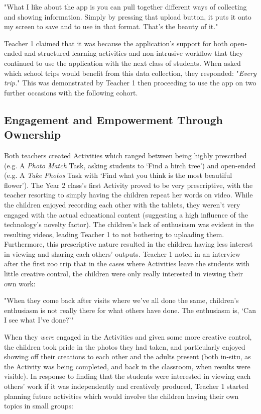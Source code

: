 \begin{displayquote}
"What I like about the app is you can pull together different ways of collecting and showing information. Simply by pressing that upload button, it puts it onto my screen to save and to use in that format. That’s the beauty of it."
\end{displayquote}

Teacher 1 claimed that it was because the application's support for both open-ended and structured learning activities and non-intrusive workflow that they continued to use the application with the next class of students. When asked which school trips would benefit from this data collection, they responded: "\textit{Every trip.}" This was demonstrated by Teacher 1 then proceeding to use the app on two further occasions with the following cohort.

\subsection{Engagement and Empowerment Through Ownership}

Both teachers created Activities which ranged between being highly prescribed (e.g. A \textit{Photo Match} Task, asking students to ‘Find a birch tree’) and open-ended (e.g. A \textit{Take Photos} Task with ‘Find what you think is the most beautiful flower’). The Year 2 class's first Activity proved to be very prescriptive, with the teacher resorting to simply having the children repeat her words on video. While the children enjoyed recording each other with the tablets, they weren't very engaged with the actual educational content (suggesting a high influence of the technology’s novelty factor). The children's lack of enthusiasm was evident in the resulting videos, leading Teacher 1 to not bothering to uploading them. Furthermore, this prescriptive nature resulted in the children having less interest in viewing and sharing each others' outputs. Teacher 1 noted in an interview after the first zoo trip that in the cases where Activities leave the students with little creative control, the children were only really interested in viewing their own work: 

\begin{displayquote}
"When they come back after visits where we've all done the same, children's enthusiasm is not really there for what others have done. The enthusiasm is, `Can I see what I've done?'"
\end{displayquote}

When they \textit{were} engaged in the Activities and given some more creative control, the children took pride in the photos they had taken, and particularly enjoyed showing off their creations to each other and the adults present (both in-situ, as the Activity was being completed, and back in the classroom, when results were visible). In response to finding that the students were interested in viewing each others' work if it was independently and creatively produced, Teacher 1 started planning future activities which would involve the children having their own topics in small groups: 

